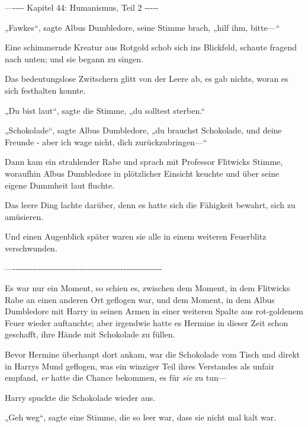 

\hypertarget{humanismus-teil-2}{%

—\/-\/-\/-\/- Kapitel 44: Humanismus, Teil 2 -\/-\/-\/-\/-

„Fawkes“, sagte Albus Dumbledore, seine Stimme brach, „hilf ihm, bitte—“

Eine schimmernde Kreatur aus Rotgold schob sich ins Blickfeld, schaute fragend nach unten; und sie begann zu singen.

Das bedeutungslose Zwitschern glitt von der Leere ab, es gab nichts, woran es sich festhalten konnte.

„Du bist laut“, sagte die Stimme, „du solltest sterben.“

„Schokolade“, sagte Albus Dumbledore, „du brauchst Schokolade, und deine Freunde - aber ich wage nicht, dich zurückzubringen—“

Dann kam ein strahlender Rabe und sprach mit Professor Flitwicks Stimme, woraufhin Albus Dumbledore in plötzlicher Einsicht keuchte und über seine eigene Dummheit laut fluchte.

Das leere Ding lachte darüber, denn es hatte sich die Fähigkeit bewahrt, sich zu amüsieren.

Und einen Augenblick später waren sie alle in einem weiteren Feuerblitz verschwunden.

—\/-\/-\/-\/-\/-\/-\/-\/-\/-\/-\/-\/-\/-\/-\/-\/-\/-\/-\/-\/-\/-\/-\/-\/-\/-\/-\/-\/-\/-\/-\/-\/-\/-\/-\/-\/-\/-\/-\/-\/-\/-\/-\/-\/-\/-\/-\/-\/-\/-\/-\/-\/-\/-\/-

Es war nur ein Moment, so schien es, zwischen dem Moment, in dem Flitwicks Rabe an einen anderen Ort geflogen war, und dem Moment, in dem Albus Dumbledore mit Harry in seinen Armen in einer weiteren Spalte aus rot-goldenem Feuer wieder auftauchte; aber irgendwie hatte es Hermine in dieser Zeit schon geschafft, ihre Hände mit Schokolade zu füllen.

Bevor Hermine überhaupt dort ankam, war die Schokolade vom Tisch und direkt in Harrys Mund geflogen, was ein winziger Teil ihres Verstandes als unfair empfand, \emph{er} hatte die Chance bekommen, es für \emph{sie} zu tun—

Harry spuckte die Schokolade wieder aus.

„Geh weg“, sagte eine Stimme, die so leer war, dass sie nicht mal kalt war.

}
